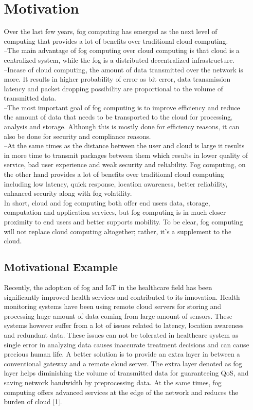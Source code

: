 \documentclass[10pt]{llncs}
\begin{document}
%
\section{Motivation}

Over the last few years, fog computing has emerged as the next level of computing that provides a lot of benefits over traditional cloud computing. \\
--The main advantage of fog computing over cloud computing is that cloud is a centralized system, while the fog is a distributed decentralized infrastructure. \\
--Incase of cloud computing, the amount of data transmitted over the network is more. It results in higher probability of error as bit error, data transmission latency and packet dropping possibility are proportional to the volume of transmitted data. \\
--The most important goal of fog computing is to improve efficiency and reduce the amount of data that needs to be transported to the cloud for processing, analysis and storage. Although this is mostly done for efficiency reasons, it can also be done for security and compliance reasons. \\
--At the same times as the distance between the user and cloud is large it results in more time to transmit packages between them which results in lower quality of service, bad user experience and weak security and reliability. Fog computing, on the other hand provides a lot of benefits over traditional cloud computing including low latency, quick response, location awareness, better reliability, enhanced security along with fog volatility. \\
In short, cloud and fog computing both offer end users data, storage, computation and application services, but fog computing is in much closer proximity to end users and better supports mobility. To be clear, fog computing will not replace cloud computing altogether; rather, it's a supplement to the cloud.

\subsection{Motivational Example}
Recently, the adoption of fog and IoT in the healthcare field has been significantly improved health services and contributed to its innovation. Health monitoring systems have been using remote cloud servers for storing and processing huge amount of data coming from large amount of sensors. These systems however suffer from a lot of issues related to latency, location awareness and redundant data. These issues can not be tolerated in healthcare system as single error in analyzing data causes inaccurate treatment decisions and can cause precious human life. A better solution is to provide an extra layer in between a conventional gateway and a remote cloud server. The extra layer denoted as fog layer helps diminishing the volume of transmitted data for guaranteeing
QoS, and saving network bandwidth by preprocessing data. At the same times, fog computing offers advanced services at the edge of the network and reduces the burden of cloud [1].
 
\end{document}
